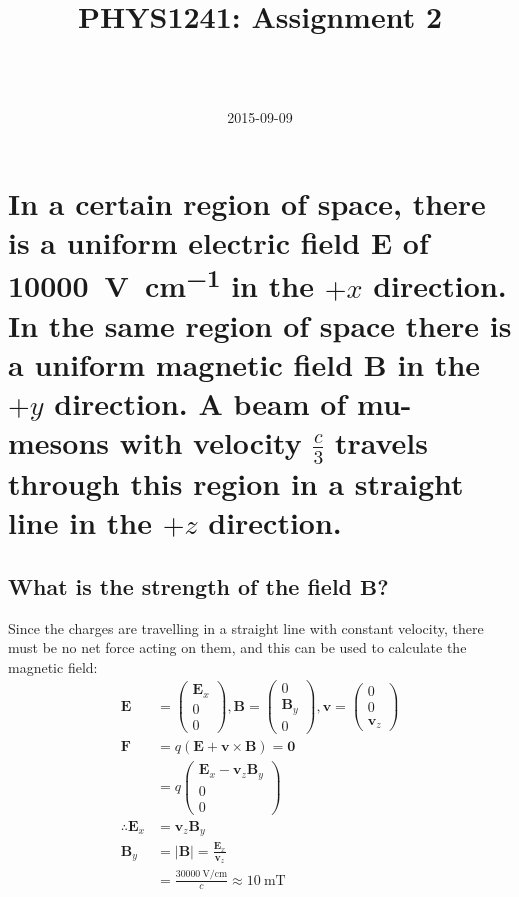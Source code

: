 \documentclass[a4paper]{scrartcl}
\begin{document}
\title{PHYS1241: Assignment 2}
\author{ \\ \\ }
\date{2015-09-09}
\maketitle

\section{In a certain region of space, there is a uniform electric field \(\mathbf{E}\) of \SI{10000}{\volt\per\centi\metre} in the \(+x\) direction. In the same region of space there is a uniform magnetic field \(\mathbf{B}\) in the \(+y\) direction. A beam of mu-mesons with velocity \(\frac{c}{3}\) travels through this region in a straight line in the \(+z\) direction.}
\subsection{What is the strength of the field \(\mathbf{B}\)?}
Since the charges are travelling in a straight line with constant velocity, there must be no net force acting on them, and this can be used to calculate the magnetic field:
\begin{align*}
    \mathbf{E} &= \begin{pmatrix}\mathbf{E}_x \\ 0 \\ 0\end{pmatrix},
    \mathbf{B} = \begin{pmatrix}0 \\ \mathbf{B}_y \\ 0\end{pmatrix},
    \mathbf{v} = \begin{pmatrix}0 \\ 0 \\ \mathbf{v}_z\end{pmatrix} \\
    \mathbf{F} &= q (\mathbf{E} + \mathbf{v} \times \mathbf{B}) = \mathbf{0} \\
    &= q \begin{pmatrix}\mathbf{E}_x - \mathbf{v}_z \mathbf{B}_y \\ 0 \\ 0\end{pmatrix} \\
    \therefore \mathbf{E}_x &= \mathbf{v}_z \mathbf{B}_y \\
    \mathbf{B}_y &= |\mathbf{B}| = \frac{\mathbf{E}_x}{\mathbf{v}_z} \\
    &= \frac{\SI{30000}{\volt\per\centi\metre}}{c} \approx \SI{10}{\milli\tesla}
\end{align*}
\end{document}
